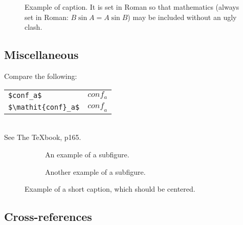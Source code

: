 \documentclass[10pt,twocolumn,letterpaper]{article}
\begin{document}
\begin{figure}[t]
  \centering
  \fbox{\rule{0pt}{2in} \rule{0.9\linewidth}{0pt}}

   \caption{Example of caption.
   It is set in Roman so that mathematics (always set in Roman: $B \sin A = A \sin B$) may be included without an ugly clash.}
   \label{fig:onecol}
\end{figure}

\subsection{Miscellaneous}

\noindent
Compare the following:\\
\begin{tabular}{ll}
 \verb'$conf_a$' &  $conf_a$ \\
 \verb'$\mathit{conf}_a$' & $\mathit{conf}_a$
\end{tabular}\\
See The \TeX book, p165.



\begin{figure*}
  \centering
  \begin{subfigure}{0.68\linewidth}
    \fbox{\rule{0pt}{2in} \rule{.9\linewidth}{0pt}}
    \caption{An example of a subfigure.}
    \label{fig:short-a}
  \end{subfigure}
  \hfill
  \begin{subfigure}{0.28\linewidth}
    \fbox{\rule{0pt}{2in} \rule{.9\linewidth}{0pt}}
    \caption{Another example of a subfigure.}
    \label{fig:short-b}
  \end{subfigure}
  \caption{Example of a short caption, which should be centered.}
  \label{fig:short}
\end{figure*}


\subsection{Cross-references}
\end{document}
